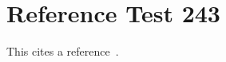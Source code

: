 \documentclass{article}
\begin{document}
\section{Reference Test 243}
This cites a reference~\cite{test243}.

\end{document}
